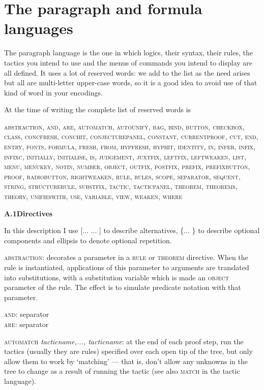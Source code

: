 \chapter{The paragraph and formula languages}
\label{appx:paraformlang}


The paragraph language is the one in which logics, their syntax, their rules, the tactics you intend to use and the menus of commands you intend to display are all defined. It uses a lot of reserved words: we add to the list as the need arises but all are multi-letter upper-case words, so it is a good idea to avoid use of that kind of word in your encodings.


At the time of writing the complete list of reserved words is


\textsc{abstraction, and, are, automatch, autounify, bag, bind, button, checkbox, class, concfresh, conchit, conjecturepanel, constant, currentproof, cut, end, entry, fonts, formula, fresh, from, hypfresh, hyphit, identity, in, infer, infix, infixc, initially, initialise, is, judgement, juxtfix, leftfix, leftweaken, list, menu, menukey, notin, number, object, outfix, postfix, prefix, prefixbutton, proof, radiobutton, rightweaken, rule, rules, scope, separator, sequent, string, structurerule, substfix, tactic, tacticpanel, theorem, theorems, theory, unifieswith, use, variable, view, weaken, where}


\textbf{{\large A.1\tab Directives}}


In this description I use [... {\textbar}... ] to describe alternatives, \{... \} to describe optional components and ellipsis to denote optional repetition.


\textsc{abstraction}: decorates a parameter in a \textsc{rule} or \textsc{theorem} directive. When the rule is instantiated, applications of this parameter to arguments are translated into substitutions, with a substitution variable which is made an \textsc{object} parameter of the rule. The effect is to simulate predicate notation with that parameter.


\textsc{and}: separator\\
\textsc{are}: separator


\textsc{automatch} \textit{tacticname,..., tacticname}: at the end of each proof step, run the tactics (usually they are rules) specified over each open tip of the tree, but only allow them to work by `matching' --- that is, don't allow any unknowns in the tree to change as a result of running the tactic (see also \textsc{match} in the tactic language).


